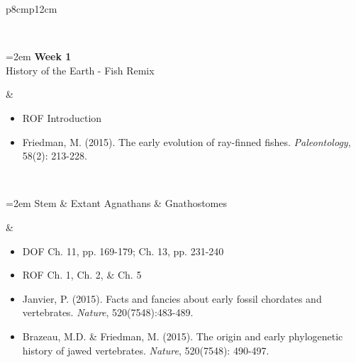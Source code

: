 \documentclass[letterpaper]{inzane_syllabus} %
\begin{document}
\begin{center}
\begin{tabularx}{\textwidth}{p{8cm}p{12cm}}

\hline
 \\
\hline
\begin{minipage}[t]{\linewidth}%
\hangindent=2em
\textbf{Week 1} \\
\textbullet History of the Earth - Fish Remix \\
\end{minipage} & 
 
\begin{minipage}[t]{\linewidth}%
\begin{itemize}
\vspace{5pt}
\item ROF Introduction
\item Friedman, M. (2015). The early evolution of ray-finned fishes. \textit{Paleontology}, 58(2): 213-228.\vspace{5pt}
\end{itemize} 
\end{minipage}\\

\begin{minipage}[t]{\linewidth}%
\hangindent=2em
\hspace{2em}\textbullet Stem \& Extant Agnathans \& Gnathostomes \\
\end{minipage} & 
 
\begin{minipage}[t]{\linewidth}%
\begin{itemize}
\item DOF Ch. 11, pp. 169-179; Ch. 13, pp. 231-240  
\item ROF Ch. 1, Ch. 2, \& Ch. 5
\item Janvier, P. (2015). Facts and fancies about early fossil chordates and vertebrates. \textit{Nature}, 520(7548):483-489.
\item Brazeau, M.D. \& Friedman, M. (2015). The origin and early phylogenetic history of jawed vertebrates. \textit{Nature}, 520(7548): 490-497.\vspace{5pt}
\end{itemize} 
\end{minipage}\\


\end{tabularx}
\end{center}
\end{document}
